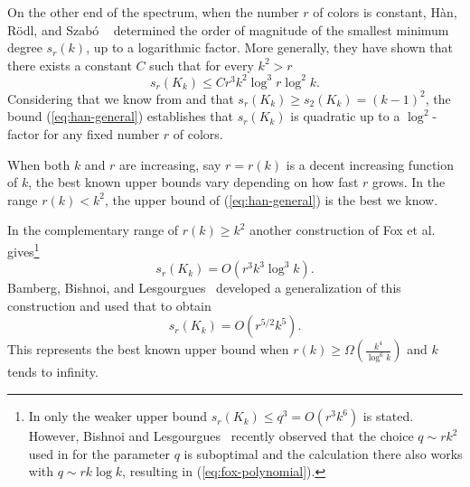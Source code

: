 \documentclass[12pt]{article}
\newcounter{foo}
\theoremstyle{definition}
\begin{document}
	On the other end of the spectrum, when the number $r$ of colors is constant, H\`an, R\"odl, and Szab\'o ~\cite{han} determined the order of magnitude of the smallest minimum degree $s_r(k)$, up to a logarithmic factor. 
	More generally, they have shown that there exists a constant $C$ such that for every $k^2 >r$
	\begin{equation} \label{eq:han-general}
		s_r(K_k) \leq C r^3k^2 \log^3 r \log^2 k.
	\end{equation}
	Considering that we know from \cite{fox2016minimum} and \cite{burr1976graphs} that
	$s_r(K_k) \geq s_2(K_k) = (k-1)^2$, the bound (\ref{eq:han-general}) establishes that $s_r(K_k)$ is quadratic up to a $\log^2$-factor for any fixed number $r$ of colors.
	
	When both $k$ and $r$ are increasing, say $r=r(k)$ is a decent increasing function of $k$, the best known upper bounds vary depending on how fast $r$ grows. In the range $r(k) < k^2$, the upper bound of (\ref{eq:han-general}) is the best we know.
	
	In the complementary range of $r(k)\geq k^2$ another construction of Fox et al.\ \cite{fox2016minimum} gives\footnote{In \cite{fox2016minimum} only the weaker upper bound $s_r(K_k) \leq q^3=O(r^3k^6)$ is stated. However, Bishnoi and Lesgourgues~\cite{bishnoi2022new} recently observed that the choice $q\sim rk^2$ used in \cite{fox2016minimum} for the parameter $q$ is suboptimal and the calculation there also works with $q \sim rk \log k$, resulting in (\ref{eq:fox-polynomial}).} 
	\begin{equation}\label{eq:fox-polynomial}
		s_r(K_k) = O(r^3k^3 \log^3 k).
	\end{equation}
	Bamberg, Bishnoi, and Lesgourgues~\cite{bamberg2022minimum} developed a generalization of this construction and used that to obtain
	\begin{equation}\label{eq:bamberg}
		s_r(K_k) = O(r^{5/2}k^5).
	\end{equation}
	This represents the best known upper bound when $r(k)\geq \Omega \left(\frac{k^4}{\log^6 k}\right)$ and $k$ tends to infinity.\\
	
\end{document}
